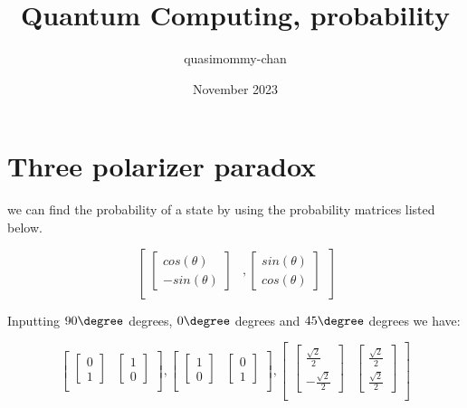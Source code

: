 \documentclass{article}
\title{Quantum Computing, probability}
\author{quasimommy-chan}
\date{November 2023}
\begin{document}
\maketitle

\section{Three polarizer paradox}

we can find the probability of a state by using the probability matrices listed below.

$$\begin{bmatrix}
    \begin{bmatrix}
        cos(\theta)\\
        -sin(\theta)
    \end{bmatrix}
    &,
    \begin{bmatrix}
        sin(\theta)\\
        cos(\theta)
    \end{bmatrix}\\
\end{bmatrix}$$

    Inputting $90\degree$ degrees, $0\degree$ degrees and $45\degree$ degrees we have:

$$\begin{bmatrix}
    \begin{bmatrix}
        0\\
        1
    \end{bmatrix}
    &
    \begin{bmatrix}
        1\\
        0
    \end{bmatrix}\\
\end{bmatrix},
\begin{bmatrix}
    \begin{bmatrix}
        1\\
        0
    \end{bmatrix}
    &
    \begin{bmatrix}
        0\\
        1
    \end{bmatrix}\\
\end{bmatrix},
\begin{bmatrix}
    \begin{bmatrix}
        \frac{\sqrt{2}}{2}\\
        -\frac{\sqrt{2}}{2}
    \end{bmatrix}
    &
    \begin{bmatrix}
        \frac{\sqrt{2}}{2}\\
        \frac{\sqrt{2}}{2}
    \end{bmatrix}\\
\end{bmatrix}$$
\end{document}

